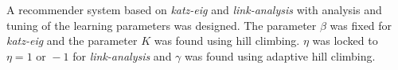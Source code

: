 

A recommender system based on \textit{katz-eig} and \textit{link-analysis} with analysis and tuning of the learning parameters was designed. The parameter $\beta$ was fixed for \textit{katz-eig} and the parameter $K$ was found using hill climbing. $\eta$ was locked to $\eta = 1 \text{ or } -1$ for \textit{link-analysis} and $\gamma$ was found using adaptive hill climbing.

